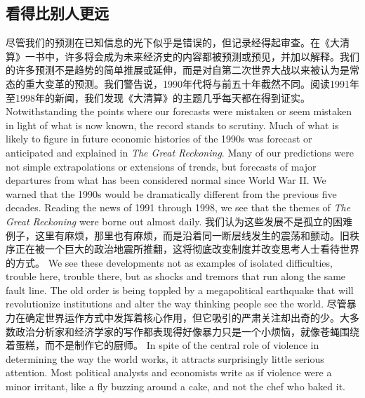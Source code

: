 \subsection{看得比别人更远}
\begin{paracol}{2}
尽管我们的预测在已知信息的光下似乎是错误的，但记录经得起审查。在《大清算》一书中，许多将会成为未来经济史的内容都被预测或预见，并加以解释。我们的许多预测不是趋势的简单推展或延伸，而是对自第二次世界大战以来被认为是常态的重大变革的预测。我们警告说，1990年代将与前五十年截然不同。阅读1991年至1998年的新闻，我们发现《大清算》的主题几乎每天都在得到证实。
\switchcolumn
Notwithstanding the points where our forecasts were mistaken or seem mistaken in light of what is now known, the record stands to scrutiny. Much of what is likely to figure in future economic histories of the 1990s was forecast or anticipated and explained in \emph{The Great Reckoning}. Many of our predictions were not simple extrapolations or extensions of trends, but forecasts of major departures from what has been considered normal since World War II. We warned that the 1990s would be dramatically different from the previous five decades. Reading the news of 1991 through 1998, we see that the themes of \emph{The Great Reckoning} were borne out almost daily.
\switchcolumn*
我们认为这些发展不是孤立的困难例子，这里有麻烦，那里也有麻烦，而是沿着同一断层线发生的震荡和颤动。旧秩序正在被一个巨大的政治地震所推翻，这将彻底改变制度并改变思考人士看待世界的方式。
\switchcolumn
We see these developments not as examples of isolated difficulties, trouble here, trouble there, but as shocks and tremors that run along the same fault line. The old order is being toppled by a megapolitical earthquake that will revolutionize institutions and alter the way thinking people see the world.
\switchcolumn*
尽管暴力在确定世界运作方式中发挥着核心作用，但它吸引的严肃关注却出奇的少。大多数政治分析家和经济学家的写作都表现得好像暴力只是一个小烦恼，就像苍蝇围绕着蛋糕，而不是制作它的厨师。
\switchcolumn
In spite of the central role of violence in determining the way the world works, it attracts surprisingly little serious attention. Most political analysts and economists write as if violence were a minor irritant, like a fly buzzing around a cake, and not the chef who baked it.
\end{paracol}

